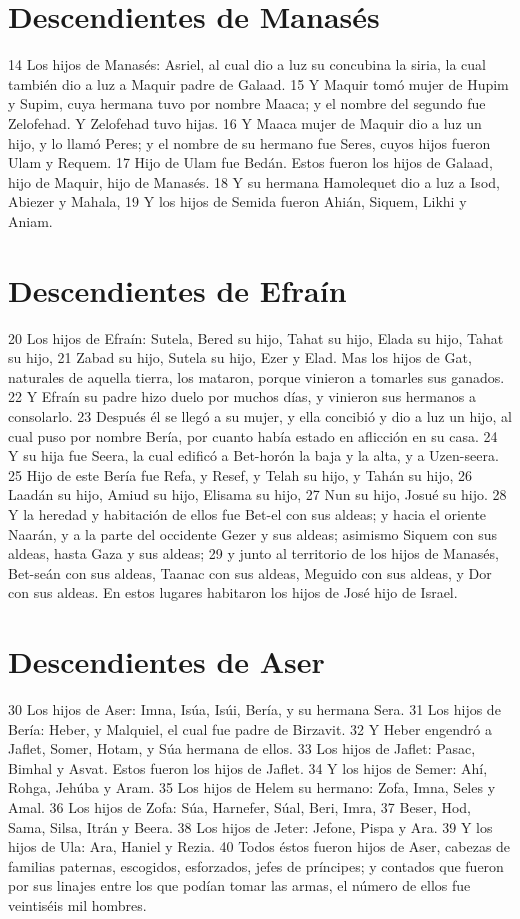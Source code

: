 \section*{Descendientes de Manasés}

14 Los hijos de Manasés: Asriel, al cual dio a luz su concubina la siria, la cual también dio a luz a Maquir padre de Galaad.
15 Y Maquir tomó mujer de Hupim y Supim, cuya hermana tuvo por nombre Maaca; y el nombre del segundo fue Zelofehad. Y Zelofehad tuvo hijas.
16 Y Maaca mujer de Maquir dio a luz un hijo, y lo llamó Peres; y el nombre de su hermano fue Seres, cuyos hijos fueron Ulam y Requem. 
17 Hijo de Ulam fue Bedán. Estos fueron los hijos de Galaad, hijo de Maquir, hijo de Manasés.
18 Y su hermana Hamolequet dio a luz a Isod, Abiezer y Mahala,
19 Y los hijos de Semida fueron Ahián, Siquem, Likhi y Aniam.

\section*{Descendientes de Efraín}

20 Los hijos de Efraín: Sutela, Bered su hijo, Tahat su hijo, Elada su hijo, Tahat su hijo,
21 Zabad su hijo, Sutela su hijo, Ezer y Elad. Mas los hijos de Gat, naturales de aquella tierra, los mataron, porque vinieron a tomarles sus ganados.
22 Y Efraín su padre hizo duelo por muchos días, y vinieron sus hermanos a consolarlo.
23 Después él se llegó a su mujer, y ella concibió y dio a luz un hijo, al cual puso por nombre Bería, por cuanto había estado en aflicción en su casa.
24 Y su hija fue Seera, la cual edificó a Bet-horón la baja y la alta, y a Uzen-seera.
25 Hijo de este Bería fue Refa, y Resef, y Telah su hijo, y Tahán su hijo,
26 Laadán su hijo, Amiud su hijo, Elisama su hijo,
27 Nun su hijo, Josué su hijo.
28 Y la heredad y habitación de ellos fue Bet-el con sus aldeas; y hacia el oriente Naarán, y a la parte del occidente Gezer y sus aldeas; asimismo Siquem con sus aldeas, hasta Gaza y sus aldeas;
29 y junto al territorio de los hijos de Manasés, Bet-seán con sus aldeas, Taanac con sus aldeas, Meguido con sus aldeas, y Dor con sus aldeas. En estos lugares habitaron los hijos de José hijo de Israel.

\section*{Descendientes de Aser}

30 Los hijos de Aser: Imna, Isúa, Isúi, Bería, y su hermana Sera.
31 Los hijos de Bería: Heber, y Malquiel, el cual fue padre de Birzavit.
32 Y Heber engendró a Jaflet, Somer, Hotam, y Súa hermana de ellos.
33 Los hijos de Jaflet: Pasac, Bimhal y Asvat. Estos fueron los hijos de Jaflet.
34 Y los hijos de Semer: Ahí, Rohga, Jehúba y Aram.
35 Los hijos de Helem su hermano: Zofa, Imna, Seles y Amal.
36 Los hijos de Zofa: Súa, Harnefer, Súal, Beri, Imra,
37 Beser, Hod, Sama, Silsa, Itrán y Beera.
38 Los hijos de Jeter: Jefone, Pispa y Ara.
39 Y los hijos de Ula: Ara, Haniel y Rezia.
40 Todos éstos fueron hijos de Aser, cabezas de familias paternas, escogidos, esforzados, jefes de príncipes; y contados que fueron por sus linajes entre los que podían tomar las armas, el número de ellos fue veintiséis mil hombres.


